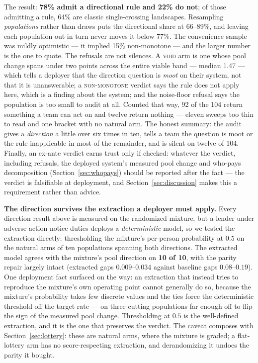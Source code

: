 \documentclass[conference]{IEEEtran}
\begin{document}
The result: \textbf{78\% admit a directional rule and 22\% do not}; of those admitting a rule, 64\% are
classic single-crossing landscapes. Resampling \emph{populations} rather than draws puts the
directional share at 66--89\%, and leaving each population out in turn never moves it below
77\%. The convenience sample was mildly optimistic --- it implied 15\% non-monotone --- and
the larger number is the one to quote. The refusals are not
silences. A \textsc{void} arm is one whose pool change spans under two points across the
entire viable band --- median 1.47 --- which tells a deployer that the direction question is
\emph{moot} on their system, not that it is unanswerable; a \textsc{non-monotone} verdict
says the rule does not apply here, which is a finding about the system; and the noise-floor
refusal says the population is too small to audit at all. Counted that way, 92 of the 104 return something a team can act on and twelve return nothing --- eleven sweeps too thin to read and one bracket with no natural arm. The honest summary: the audit gives a \emph{direction}
a little over six times in ten, tells a team the question is moot or the rule inapplicable in most of the remainder, and is silent on twelve of 104. Finally, an ex-ante verdict earns trust only if checked:
whatever the verdict, including refusals, the deployed system's measured pool change and
who-pays decomposition (Section~\ref{sec:whopays}) should be reported after the fact ---
the verdict is falsifiable at deployment, and Section~\ref{sec:discussion} makes this a
requirement rather than advice.

\textbf{The direction survives the extraction a deployer must apply.} Every direction
result above is measured on the randomized mixture, but a lender under
adverse-action-notice duties deploys a \emph{deterministic} model, so we tested the
extraction directly: thresholding the mixture's per-person probability at $0.5$ on the
natural arms of ten populations spanning both directions. The extracted model agrees
with the mixture's pool direction on \textbf{10 of 10}, with the parity repair largely
intact (extracted gaps $0.009$--$0.034$ against baseline gaps $0.08$--$0.19$). One
deployment fact surfaced on the way: an extraction that instead tries to reproduce the
mixture's own operating point cannot generally do so, because the mixture's probability
takes few discrete values and the ties force the deterministic threshold off the target
rate --- on three cutting populations far enough off to flip the sign of the measured
pool change. Thresholding at $0.5$ is the well-defined extraction, and it is the one
that preserves the verdict. The caveat composes with Section~\ref{sec:lottery}: these
are natural arms, where the mixture is graded; a flat-lottery arm has no
score-respecting extraction, and derandomizing it undoes the parity it bought.
\end{document}
